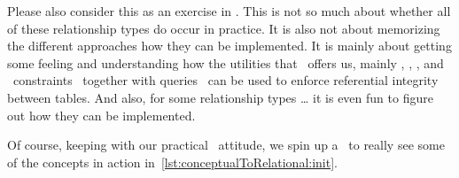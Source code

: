 Please also consider this as an exercise in \sql.
This is not so much about whether all of these relationship types do occur in practice.
It is also not about memorizing the different approaches how they can be implemented.
It is mainly about getting some feeling and understanding how the utilities that \sql\ offers us, mainly , , , and ~constraints~\cite{PGDG:PD:C} together with  queries~\cite{PGDG:PD:JT} can be used to enforce referential integrity between tables.
And also, for some relationship types {\dots} it is even fun to figure out how they can be implemented.

Of course, keeping with our practical ~attitude, we spin up a \db\ to really see some of the concepts in action in~\cref{lst:conceptualToRelational:init}.%
%
%
%
\FloatBarrier%

